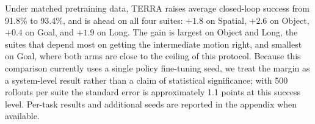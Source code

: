 Under matched pretraining data, TERRA raises average closed-loop success from
91.8\% to 93.4\%, and is ahead on all four suites: $+1.8$ on Spatial, $+2.6$
on Object, $+0.4$ on Goal, and $+1.9$ on Long.
The gain is largest on Object and Long, the suites that depend most on getting
the intermediate motion right, and smallest on Goal, where both arms are close
to the ceiling of this protocol.
Because this comparison currently uses a single policy fine-tuning seed, we
treat the margin as a system-level result rather than a claim of statistical
significance; with 500 rollouts per suite the standard error is approximately
1.1 points at this success level.
Per-task results and additional seeds are reported in the appendix when
available.

%


